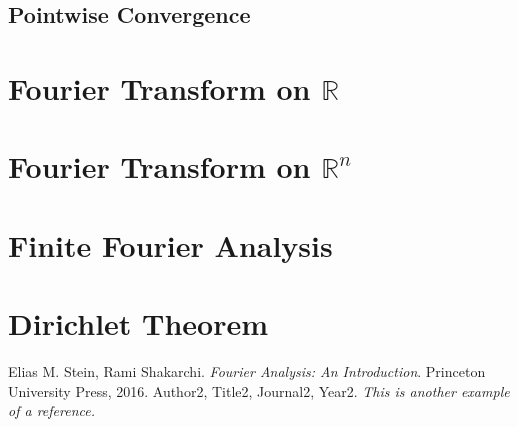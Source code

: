 \documentclass[11pt]{../../TexTemplate/elegantbook} %
\begin{document}
\section{Pointwise Convergence} %

\chapter{Fourier Transform on \(\mathbb{R}\)} %

\chapter{Fourier Transform on \(\mathbb{R}^n\)} %

\chapter{Finite Fourier Analysis} %

\chapter{Dirichlet Theorem} %


\begin{thebibliography}{99} 
 Elias M. Stein, Rami Shakarchi. \emph{Fourier Analysis: An Introduction}. Princeton University Press, 2016.
 Author2, Title2, Journal2, Year2. \emph{ This is another example of a reference.}
\end{thebibliography}
\end{document}
